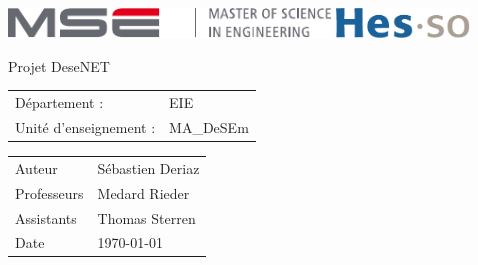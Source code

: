 \documentclass[]{article}
\begin{document}
\thispagestyle{empty}

\begin{center}
\includegraphics[height=8mm]{mse-full-cropped.pdf}
\hfill
\includegraphics[height=8mm]{HES-SO_logo_Pantone.pdf}
\end{center}
\vfill
\begin{center}
\Huge Projet DeseNET\\
\end{center}
\begin{center}
\large
\begin{tabular}{ll}
Département : & EIE\\
Unité d'enseignement : & MA\_DeSEm
\end{tabular}
\end{center}
\vfill
\begin{center}
\large
\begin{tabular}{ll}
\Large Auteur & \Large Sébastien Deriaz\\
Professeurs & Medard Rieder\\ 
Assistants & Thomas Sterren\\
Date &\today
\end{tabular}
\end{center}
\vfill

\pagebreak
\tableofcontents
\pagebreak



\end{document}
